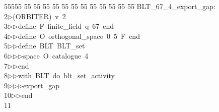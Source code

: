 %
%
\begin{tabbing}
55555 \= 55 \= 55 \= 55 \= 55 \= 55 \= 55 \= 55 \= 55 \= 55 \= 55 \= 55 \= 55 \= \>BLT\_67\_4\_export\_gap:\\[0pt]
2\>$\triangleright$\>(ORBITER)\ v\ 2\ \\[0pt]
3\>$\triangleright$\>$\triangleright$\>define\ F\ finite\_field\ q\ 67\ end\ \\[0pt]
4\>$\triangleright$\>$\triangleright$\>define\ O\ orthogonal\_space\ 0\ 5\ F\ end\ \\[0pt]
5\>$\triangleright$\>$\triangleright$\>define\ BLT\ BLT\_set\ \\[0pt]
6\>$\triangleright$\>$\triangleright$\>$\triangleright$\>space\ O\ catalogue\ 4\ \\[0pt]
7\>$\triangleright$\>$\triangleright$\>end\ \\[0pt]
8\>$\triangleright$\>$\triangleright$\>with\ BLT\ do\ blt\_set\_activity\ \\[0pt]
9\>$\triangleright$\>$\triangleright$\>$\triangleright$\>export\_gap\ \\[0pt]
10\>$\triangleright$\>$\triangleright$\>end\\[0pt]
11\>\end{tabbing}
